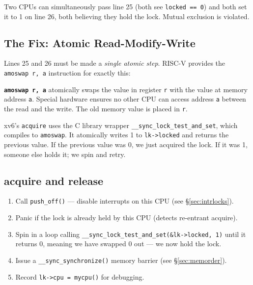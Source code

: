 \documentclass[11pt, a4paper]{article}
\begin{document}
Two CPUs can simultaneously pass line 25 (both see \lstinline|locked == 0|) and both set it to 1 on line 26, both believing they hold the lock. Mutual exclusion is violated.

\subsection{The Fix: Atomic Read-Modify-Write}

Lines 25 and 26 must be made a \emph{single atomic step}. RISC-V provides the \lstinline|amoswap r, a| instruction for exactly this:

\begin{tcolorbox}[foundational]
\textbf{\lstinline|amoswap r, a|} atomically swaps the value in register \lstinline|r| with the value at memory address \lstinline|a|. Special hardware ensures no other CPU can access address \lstinline|a| between the read and the write. The old memory value is placed in \lstinline|r|.

xv6's \lstinline|acquire| uses the C library wrapper \lstinline|__sync_lock_test_and_set|, which compiles to \lstinline|amoswap|. It atomically writes 1 to \lstinline|lk->locked| and returns the previous value. If the previous value was 0, we just acquired the lock. If it was 1, someone else holds it; we spin and retry.
\end{tcolorbox}

\subsection{acquire and release}

\begin{tcolorbox}[spinlock, title={Spinlock: acquire (kernel/spinlock.c:22)}]
\begin{enumerate}[leftmargin=1.8em, itemsep=0.2em]
  \item Call \lstinline|push_off()| --- disable interrupts on this CPU (see \S\ref{sec:intrlocks}).
  \item Panic if the lock is already held by this CPU (detects re-entrant acquire).
  \item Spin in a loop calling \lstinline|__sync_lock_test_and_set(&lk->locked, 1)| until it returns 0, meaning we have swapped 0 out --- we now hold the lock.
  \item Issue a \lstinline|__sync_synchronize()| memory barrier (see \S\ref{sec:memorder}).
  \item Record \lstinline|lk->cpu = mycpu()| for debugging.
\end{enumerate}
\end{tcolorbox}
\end{document}
